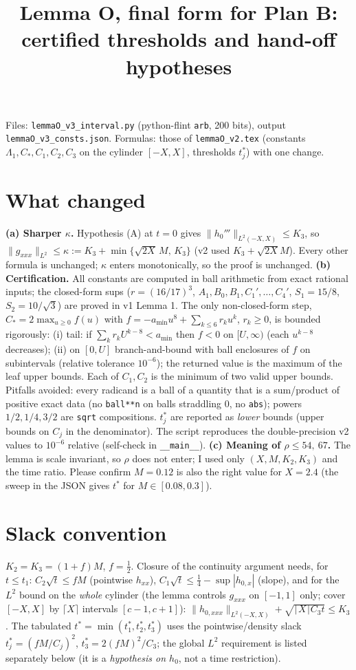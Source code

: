 \documentclass[11pt]{article}
\title{Lemma O, final form for Plan B: certified thresholds and hand-off hypotheses}\author{}\date{}
\begin{document}
\maketitle
\noindent Files: \texttt{lemmaO\_v3\_interval.py} (python-flint \texttt{arb}, 200 bits), output \texttt{lemmaO\_v3\_consts.json}. Formulas: those of \texttt{lemmaO\_v2.tex} (constants $\Lambda_1,C_*,C_1,C_2,C_3$ on the cylinder $[-X,X]$, thresholds $t_j^*$) with one change.

\section{What changed}
\textbf{(a) Sharper $\kappa$.} Hypothesis (A) at $t=0$ gives $\|h_0'''\|_{L^2(-X,X)}\le K_3$, so $\|g_{xxx}\|_{L^2}\le\kappa:=K_3+\min\{\sqrt{2X}\,M,\,K_3\}$ (v2 used $K_3+\sqrt{2X}M$). Every other formula is unchanged; $\kappa$ enters monotonically, so the proof is unchanged.
\textbf{(b) Certification.} All constants are computed in ball arithmetic from exact rational inputs; the closed-form sups ($r=(16/17)^3$, $A_1,B_0,B_1,C_1',\dots,C_4'$, $S_1=15/8$, $S_2=10/\sqrt3$) are proved in v1 Lemma 1. The only non-closed-form step, $C_*=2\max_{u\ge0}f(u)$ with $f=-a_{\min}u^8+\sum_{k\le6}r_ku^k$, $r_k\ge0$, is bounded rigorously: (i) tail: if $\sum_kr_kU^{k-8}<a_{\min}$ then $f<0$ on $[U,\infty)$ (each $u^{k-8}$ decreases); (ii) on $[0,U]$ branch-and-bound with ball enclosures of $f$ on subintervals (relative tolerance $10^{-6}$); the returned value is the maximum of the leaf upper bounds. Each of $C_1,C_2$ is the minimum of two valid upper bounds. Pitfalls avoided: every radicand is a ball of a quantity that is a sum/product of positive exact data (no \texttt{ball**n} on balls straddling $0$, no \texttt{abs}); powers $1/2,1/4,3/2$ are \texttt{sqrt} compositions. $t_j^*$ are reported as \emph{lower} bounds (upper bounds on $C_j$ in the denominator). The script reproduces the double-precision v2 values to $10^{-6}$ relative (self-check in \texttt{\_\_main\_\_}).
\textbf{(c) Meaning of $\rho\le54,\ 67$.} The lemma is scale invariant, so $\rho$ does not enter; I used only $(X,M,K_2,K_3)$ and the time ratio. Please confirm $M=0.12$ is also the right value for $X=2.4$ (the sweep in the JSON gives $t^*$ for $M\in[0.08,0.3]$).

\section{Slack convention}
$K_2=K_3=(1+f)M$, $f=\frac12$. Closure of the continuity argument needs, for $t\le t_1$: $C_2\sqrt t\le fM$ (pointwise $h_{xx}$), $C_1\sqrt t\le \frac14-\sup|h_{0,x}|$ (slope), and for the $L^2$ bound on the \emph{whole} cylinder (the lemma controls $g_{xxx}$ on $[-1,1]$ only; cover $[-X,X]$ by $\lceil X\rceil$ intervals $[c-1,c+1]$): $\|h_{0,xxx}\|_{L^2(-X,X)}+\sqrt{\lceil X\rceil C_3t}\le K_3$. The tabulated $t^*=\min(t_1^*,t_2^*,t_3^*)$ uses the pointwise/density slack $t_j^*=(fM/C_j)^2$, $t_3^*=2(fM)^2/C_3$; the global $L^2$ requirement is listed separately below (it is a \emph{hypothesis on $h_0$}, not a time restriction).
\end{document}
